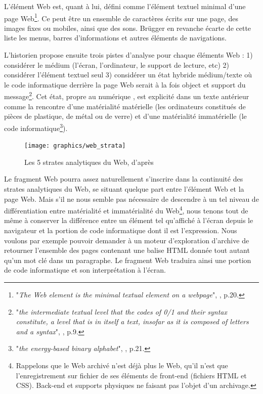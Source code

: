 \documentclass[symmetric,justified,marginals=raggedouter]{tufte-book}
\begin{document}
L'élément Web est, quant à lui, défini comme l'élément textuel minimal d'une page Web\footnote{"\textit{The Web element is the minimal textual element on a webpage}", \citep{brugger_website_2009}, p.20.}. Ce peut être un ensemble de caractères écrits sur une page, des images fixes ou mobiles, ainsi que des sons. Brügger en revanche écarte de cette liste les menus, barres d'informations et autres éléments de navigations. 

L'historien propose ensuite trois pistes d'analyse pour chaque éléments Web : 1) considérer le médium (l'écran, l'ordinateur, le support de lecture, etc) 2) considérer l'élément textuel seul 3) considérer un état hybride médium/texte où le code informatique derrière la page Web serait à la fois object et support du message\footnote{"\textit{the intermediate textual level that the codes of 0/1 and their syntax constitute, a level that is in itself a text, insofar as it is composed of letters and a syntax}", \citep{brugger_website_2009}, p.9.}. Cet état, propre au numérique \citep{finnemann_modernity_1997}, est explicité dans un texte antérieur \citep{brugger_does_2002} comme la rencontre d'une matérialité matérielle (les ordinateurs constitués de pièces de plastique, de métal ou de verre) et d'une matérialité immatérielle (le code informatique\footnote{"\textit{the energy-based binary alphabet}", \citep{brugger_does_2002}, p.21.}).

\begin{figure}
  \centering
  \texttt{[image: graphics/web\_strata]}
  \caption{Les 5 strates analytiques du Web, d'après \citep{brugger_website_2009}}
  \label{fig:web_strata}
\end{figure}

Le fragment Web pourra assez naturellement s'inscrire dans la continuité des strates analytiques du Web, se situant quelque part entre l'élément Web et la page Web. Mais s'il ne nous semble pas nécessaire de descendre à un tel niveau de différentiation entre matérialité et immatérialité du Web\footnote{Rappelons que le Web archivé n'est déjà plus le Web, qu'il n'est que l'enregistrement sur fichier de ses éléments de front-end (fichiers HTML et CSS). Back-end et supports physiques ne faisant pas l'objet d'un archivage.}, nous tenons tout de même à conserver la différence entre un élément tel qu'affiché à l'écran depuis le navigateur et la portion de code informatique dont il est l'expression. Nous voulons par exemple pouvoir demander à un moteur d'exploration d'archive de retourner l'ensemble des pages contenant une balise HTML donnée tout autant qu'un mot clé dans un paragraphe. Le fragment Web traduira ainsi une portion de code informatique et son interprétation à l'écran.
\end{document}
